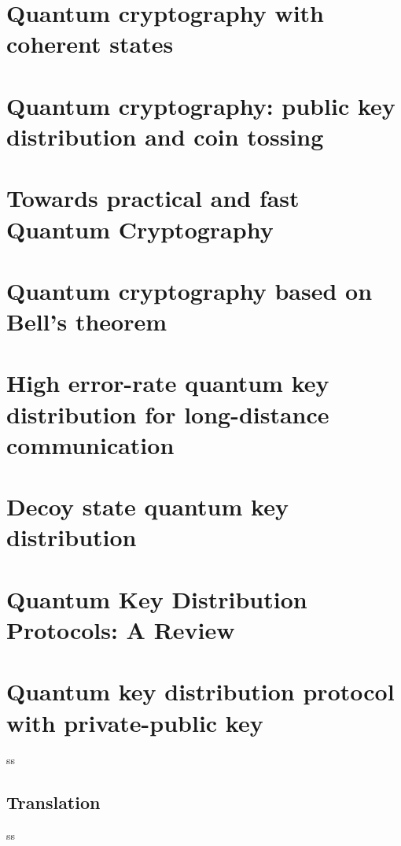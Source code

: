 

\newcommand{\trnas}{Translation}
\newcommand{\dic}{Dictionary}
\newcommand{\review}{Review}




\tableofcontents
\clearpage
\section{Quantum cryptography with coherent states}

%
\section{Quantum cryptography: public key distribution and coin tossing}



\section{Towards practical and fast Quantum Cryptography}



\section{Quantum cryptography based on Bell's theorem}


\section{High error-rate quantum key distribution for long-distance communication }



\section{Decoy state quantum key distribution}




\section{Quantum Key Distribution Protocols: A Review}



\section{Quantum key distribution protocol with private-public key}
ss
\subsection*{\trnas}
ss
